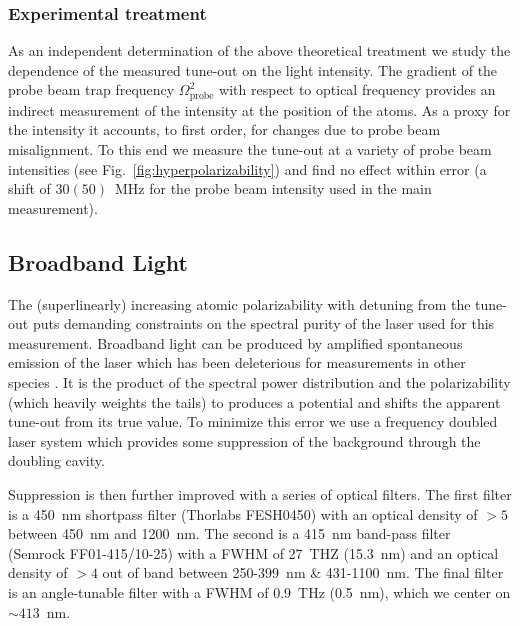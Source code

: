 \documentclass[%
 amsmath,amssymb,
aps,
]{revtex4-2}
\begin{document}
\subsubsection{Experimental treatment}
As an independent determination of the above theoretical treatment we study the dependence of the measured tune-out on the light intensity. The gradient of the probe beam trap frequency \(\Omega_{\text{probe}}^2\) with respect to optical frequency provides an indirect measurement of the intensity at the position of the atoms. As a proxy for the intensity it accounts, to first order, for changes due to probe beam misalignment. To this end we measure the tune-out at a variety of probe beam intensities (see Fig.~\ref{fig:hyperpolarizability}) and find no effect within error (a shift of $30(50)$~MHz for the probe beam intensity used in the main measurement).

\subsection{Broadband Light}
The (superlinearly) increasing atomic polarizability with detuning from the tune-out puts demanding constraints on the spectral purity of the laser used for this measurement. Broadband light can be produced by amplified spontaneous emission of the laser which has been deleterious for measurements in other species \cite{HolmgrenPhd}. It is the product of the spectral power distribution and the polarizability (which heavily weights the tails) to produces a potential and shifts the apparent tune-out from its true value. To minimize this error we use a frequency doubled laser system which provides some suppression of the background through the doubling cavity. 

Suppression is then further improved with a series of optical filters. The first filter is a 450~nm shortpass filter (Thorlabs FESH0450) with an optical density of $>5$ between 450~nm and 1200~nm.  The second is a 415~nm band-pass filter (Semrock FF01-415/10-25) with a FWHM of 27~THZ (15.3~nm) and an optical density of $>4$ out of band between 250-399~nm \& 431-1100~nm. The final filter is an angle-tunable filter with a FWHM of 0.9~THz (0.5~nm), which we center on \(\sim 413\)~nm.
\end{document}
